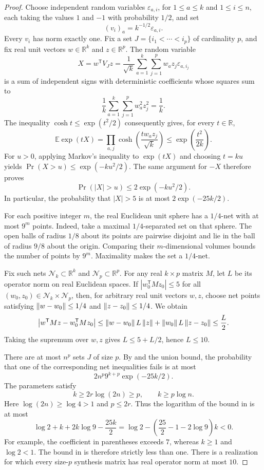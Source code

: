 \begin{proof}
Choose independent random variables $\varepsilon_{a,i}$, for
$1\le a\le k$ and $1\le i\le n$, each taking the values $1$ and $-1$
with probability $1/2$, and set
\[
 (v_i)_a=k^{-1/2}\varepsilon_{a,i}.
\]
Every $v_i$ has norm exactly one.  Fix a set
$J=\{i_1<\cdots<i_p\}$ of cardinality $p$, and fix real unit vectors
$w\in\mathbb R^k$ and $z\in\mathbb R^p$.  The random variable
\[
 X=w^{\mathsf T}V_Jz
   =\frac1{\sqrt{k}}
     \sum_{a=1}^k\sum_{j=1}^p w_a z_j\varepsilon_{a,i_j}
\]
is a sum of independent signs with deterministic coefficients whose
squares sum to
\[
 \frac1k\sum_{a=1}^k\sum_{j=1}^p w_a^2z_j^2=\frac1k.
\]
The inequality $\cosh t\le\exp(t^2/2)$ consequently gives, for every
$t\in\mathbb R$,
\[
 \mathbb E\exp(tX)
 =\prod_{a,j}\cosh\!\left(\frac{t w_a z_j}{\sqrt{k}}\right)
 \le\exp\!\left(\frac{t^2}{2k}\right).
\]
For $u>0$, applying Markov's inequality to $\exp(tX)$ and choosing
$t=ku$ yields $\Pr(X>u)\le\exp(-ku^2/2)$.  The same argument for
$-X$ therefore proves
\begin{equation}
\label{eq:sign-tail}
 \Pr(|X|>u)\le 2\exp(-ku^2/2).
\end{equation}
In particular, the probability that $|X|>5$ is at most
$2\exp(-25k/2)$.

For each positive integer $m$, the real Euclidean unit sphere has a
$1/4$-net with at most $9^m$ points.  Indeed, take a maximal
$1/4$-separated set on that sphere.  The open balls of radius $1/8$
about its points are pairwise disjoint and lie in the ball of radius
$9/8$ about the origin.  Comparing their $m$-dimensional volumes bounds
the number of points by $9^m$.  Maximality makes the set a $1/4$-net.

Fix such nets $\mathcal N_k\subset\mathbb R^k$ and
$\mathcal N_p\subset\mathbb R^p$.  For any real $k\times p$ matrix
$M$, let $L$ be its operator norm on real Euclidean spaces.  If
$|w_0^{\mathsf T}Mz_0|\le5$ for all
$(w_0,z_0)\in\mathcal N_k\times\mathcal N_p$, then, for arbitrary
real unit vectors $w,z$, choose net points satisfying
$\left\lVert w-w_0\right\rVert\le1/4$ and $\left\lVert z-z_0\right\rVert\le1/4$.  We obtain
\[
 \left|w^{\mathsf T}Mz-w_0^{\mathsf T}Mz_0\right|
 \le \left\lVert w-w_0\right\rVert L\left\lVert z\right\rVert
       +\left\lVert w_0\right\rVert L\left\lVert z-z_0\right\rVert
 \le\frac L2.
\]
Taking the supremum over $w,z$ gives $L\le5+L/2$, hence $L\le10$.

There are at most $n^p$ sets $J$ of size $p$.  By
 and the union bound, the probability that one of
the corresponding net inequalities fails is at most
\begin{equation}
\label{eq:frame-failure-probability}
 2n^p9^{k+p}\exp(-25k/2).
\end{equation}
The parameters satisfy
\[
 k\ge2r\log(2n)\ge p,
 \qquad k\ge p\log n.
\]
Here $\log(2n)\ge\log4>1$ and $p\le2r$.  Thus the logarithm of
the bound in  is at most
\[
 \log2+k+2k\log9-\frac{25k}{2}
 =\log2-\left(\frac{25}{2}-1-2\log9\right)k<0.
\]
For example, the coefficient in parentheses exceeds $7$, whereas
$k\ge1$ and $\log2<1$.  The bound in
 is therefore strictly less than
one.  There is a realization for which every size-$p$ synthesis
matrix has real operator norm at most $10$.


\end{proof}
